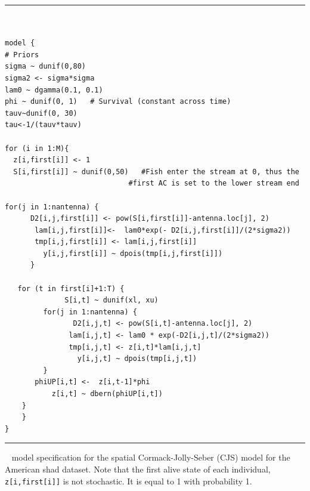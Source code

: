 \begin{panel}[htp]
\centering
\rule[0.1in]{\textwidth}{.03in}
{\small
\begin{verbatim}


model {
# Priors
sigma ~ dunif(0,80)
sigma2 <- sigma*sigma
lam0 ~ dgamma(0.1, 0.1)
phi ~ dunif(0, 1)   # Survival (constant across time)
tauv~dunif(0, 30)
tau<-1/(tauv*tauv)

for (i in 1:M){
  z[i,first[i]] <- 1
  S[i,first[i]] ~ dunif(0,50)   #Fish enter the stream at 0, thus the
			                 #first AC is set to the lower stream end

for(j in 1:nantenna) {
	  D2[i,j,first[i]] <- pow(S[i,first[i]]-antenna.loc[j], 2)
       lam[i,j,first[i]]<-  lam0*exp(- D2[i,j,first[i]]/(2*sigma2))
       tmp[i,j,first[i]] <- lam[i,j,first[i]]
         y[i,j,first[i]] ~ dpois(tmp[i,j,first[i]])
      }

   for (t in first[i]+1:T) {
	          S[i,t] ~ dunif(xl, xu) 
         for(j in 1:nantenna) {
		        D2[i,j,t] <- pow(S[i,t]-antenna.loc[j], 2)
               lam[i,j,t] <- lam0 * exp(-D2[i,j,t]/(2*sigma2))
	           tmp[i,j,t] <- z[i,t]*lam[i,j,t]
		         y[i,j,t] ~ dpois(tmp[i,j,t])
		 }
 	   phiUP[i,t] <-  z[i,t-1]*phi
	       z[i,t] ~ dbern(phiUP[i,t])
	}
	}
}
\end{verbatim}
}
\rule[-0.1in]{\textwidth}{.03in}
\caption{
\jags~ model specification for the spatial
Cormack-Jolly-Seber (CJS) model for the American shad dataset. Note that the first alive state of
each individual, \mbox{\tt z[i,first[i]]} is not stochastic. It is
equal to 1 with probability 1.}
\label{open.panel.spatialCJS}
\end{panel}







